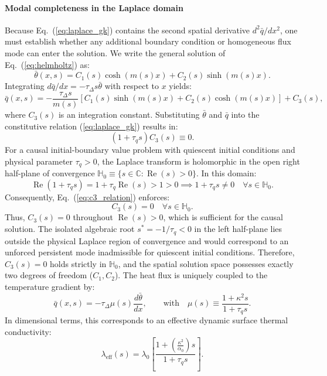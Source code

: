 \documentclass[preprint,12pt]{elsarticle}
\begin{document}
\paragraph{Modal completeness in the Laplace domain}
Because Eq.~(\ref{eq:laplace_gk}) contains the second spatial derivative $d^2\bar{q}/dx^2$, one must establish whether any additional boundary condition or homogeneous flux mode can enter the solution. We write the general solution of Eq.~(\ref{eq:helmholtz}) as:
\begin{equation}
\bar{\theta}(x, s) = C_1(s) \cosh(m(s) x) + C_2(s) \sinh(m(s) x).
\end{equation}
Integrating $d\bar{q}/dx = -\tau_\Delta s \bar{\theta}$ with respect to $x$ yields:
\begin{equation}
\bar{q}(x, s) = -\frac{\tau_\Delta s}{m(s)} [C_1(s) \sinh(m(s) x) + C_2(s) \cosh(m(s) x)] + C_3(s),
\end{equation}
where $C_3(s)$ is an integration constant. Substituting $\bar{\theta}$ and $\bar{q}$ into the constitutive relation (\ref{eq:laplace_gk}) results in:
\begin{equation}
(1 + \tau_q s) C_3(s) \equiv 0.
\label{eq:c3_relation}
\end{equation}
For a causal initial-boundary value problem with quiescent initial conditions and physical parameter $\tau_q > 0$, the Laplace transform is holomorphic in the open right half-plane of convergence $\mathbb{H}_0 \equiv \{s \in \mathbb{C} : \operatorname{Re}(s) > 0\}$. In this domain:
\begin{equation}
\operatorname{Re}(1 + \tau_q s) = 1 + \tau_q \operatorname{Re}(s) > 1 > 0 \implies 1 + \tau_q s \ne 0 \quad \forall s \in \mathbb{H}_0.
\end{equation}
Consequently, Eq.~(\ref{eq:c3_relation}) enforces:
\begin{equation}
C_3(s) = 0 \quad \forall s \in \mathbb{H}_0.
\end{equation}
Thus, $C_3(s) = 0$ throughout $\operatorname{Re}(s) > 0$, which is sufficient for the causal solution. The isolated algebraic root $s^* = -1/\tau_q < 0$ in the left half-plane lies outside the physical Laplace region of convergence and would correspond to an unforced persistent mode inadmissible for quiescent initial conditions. Therefore, $C_3(s) = 0$ holds strictly in $\mathbb{H}_0$, and the spatial solution space possesses exactly two degrees of freedom ($C_1, C_2$). The heat flux is uniquely coupled to the temperature gradient by:
\begin{equation}
\bar{q}(x, s) = -\tau_\Delta \mu(s) \frac{d\bar{\theta}}{dx}, \qquad \text{with} \quad \mu(s) \equiv \frac{1 + \kappa^2 s}{1 + \tau_q s}.
\label{eq:dynamic_flux}
\end{equation}
In dimensional terms, this corresponds to an effective dynamic surface thermal conductivity:
\begin{equation}
\lambda_{\mathrm{eff}}(s) = \lambda_0 \left[\frac{1 + \left(\frac{\kappa^2}{\alpha_0}\right)s}{1 + \tau_q s}\right].
\label{eq:lambda_eff}
\end{equation}
\end{document}
